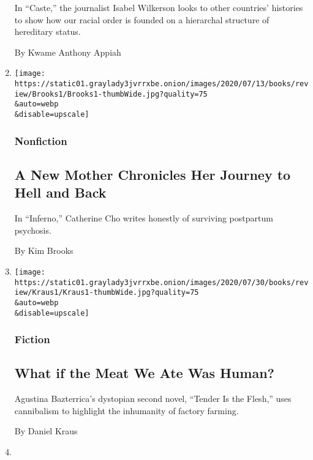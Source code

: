 \begin{enumerate}
  In ``Caste,'' the journalist Isabel Wilkerson looks to other
  countries' histories to show how our racial order is founded on a
  hierarchal structure of hereditary status.

  By Kwame Anthony Appiah
\item
  \href{/2020/08/04/books/review/inferno-catherine-cho.html}{}

  \texttt{[image: https://static01.graylady3jvrrxbe.onion/images/2020/07/13/books/review/Brooks1/Brooks1-thumbWide.jpg?quality=75\\\&auto=webp\\\&disable=upscale]}

  \hypertarget{nonfiction-3}{%
  \subsubsection{Nonfiction}\label{nonfiction-3}}

  \hypertarget{a-new-mother-chronicles-her-journey-to-hell-and-back}{%
  \subsection{A New Mother Chronicles Her Journey to Hell and
  Back}\label{a-new-mother-chronicles-her-journey-to-hell-and-back}}

  In ``Inferno,'' Catherine Cho writes honestly of surviving postpartum
  psychosis.

  By Kim Brooks
\item
  \href{/2020/08/04/books/review/tender-is-the-flesh-agustina-bazterrica.html}{}

  \texttt{[image: https://static01.graylady3jvrrxbe.onion/images/2020/07/30/books/review/Kraus1/Kraus1-thumbWide.jpg?quality=75\\\&auto=webp\\\&disable=upscale]}

  \hypertarget{fiction}{%
  \subsubsection{Fiction}\label{fiction}}

  \hypertarget{what-if-the-meat-we-ate-was-human}{%
  \subsection{What if the Meat We Ate Was
  Human?}\label{what-if-the-meat-we-ate-was-human}}

  Agustina Bazterrica's dystopian second novel, ``Tender Is the Flesh,''
  uses cannibalism to highlight the inhumanity of factory farming.

  By Daniel Kraus
\item
  \href{/2020/08/04/books/review/edmund-white-saint-from-texas.html}{}


\end{enumerate}
